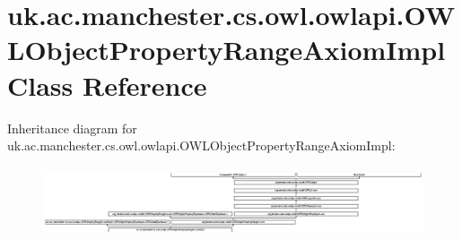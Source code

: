 \hypertarget{classuk_1_1ac_1_1manchester_1_1cs_1_1owl_1_1owlapi_1_1_o_w_l_object_property_range_axiom_impl}{\section{uk.\-ac.\-manchester.\-cs.\-owl.\-owlapi.\-O\-W\-L\-Object\-Property\-Range\-Axiom\-Impl Class Reference}
\label{classuk_1_1ac_1_1manchester_1_1cs_1_1owl_1_1owlapi_1_1_o_w_l_object_property_range_axiom_impl}
}
Inheritance diagram for uk.\-ac.\-manchester.\-cs.\-owl.\-owlapi.\-O\-W\-L\-Object\-Property\-Range\-Axiom\-Impl\-:\begin{figure}[H]
\begin{center}
\leavevmode
\includegraphics[height=2.088578cm]{classuk_1_1ac_1_1manchester_1_1cs_1_1owl_1_1owlapi_1_1_o_w_l_object_property_range_axiom_impl}
\end{center}
\end{figure}
